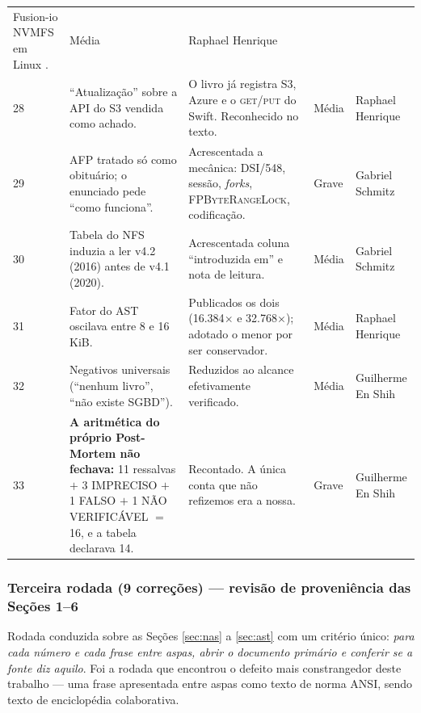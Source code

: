 \documentclass[11pt,a4paper]{article}
\begin{document}
{\begin{longtable}{@{}p{0.35cm}p{4.6cm}p{5.5cm}p{2.0cm}p{2.0cm}@{}}
Fusion-io NVMFS em Linux \cite{mysqldw}. & Média & Raphael Henrique \\
28 & ``Atualização'' sobre a API do S3 vendida como achado. & O livro já registra S3, Azure e o
\textsc{get}/\textsc{put} do Swift. Reconhecido no texto. & Média & Raphael Henrique \\
29 & AFP tratado só como obituário; o enunciado pede ``como funciona''. & Acrescentada a mecânica:
DSI/548, sessão, \textit{forks}, \textsc{FPByteRangeLock}, codificação. & Grave & Gabriel Schmitz \\
30 & Tabela do NFS induzia a ler v4.2 (2016) antes de v4.1 (2020). & Acrescentada coluna
``introduzida em'' e nota de leitura. & Média & Gabriel Schmitz \\
31 & Fator do AST oscilava entre 8 e 16 KiB. & Publicados os dois (16.384$\times$ e
32.768$\times$); adotado o menor por ser conservador. & Média & Raphael Henrique \\
32 & Negativos universais (``nenhum livro'', ``não existe SGBD''). & Reduzidos ao alcance
efetivamente verificado. & Média & Guilherme En Shih \\
33 & \textbf{A aritmética do próprio Post-Mortem não fechava:} 11 ressalvas $+$ 3 IMPRECISO $+$ 1
FALSO $+$ 1 NÃO VERIFICÁVEL $=$ 16, e a tabela declarava 14. & Recontado. A única conta que não
refizemos era a nossa. & Grave & Guilherme En Shih \\
\end{longtable}}

\subsubsection*{Terceira rodada (9 correções) --- revisão de proveniência das Seções 1--6}

Rodada conduzida sobre as Seções \ref{sec:nas} a \ref{sec:ast} com um critério único: \emph{para
cada número e cada frase entre aspas, abrir o documento primário e conferir se a fonte diz aquilo}.
Foi a rodada que encontrou o defeito mais constrangedor deste trabalho --- uma frase apresentada
entre aspas como texto de norma ANSI, sendo texto de enciclopédia colaborativa.
\end{document}
